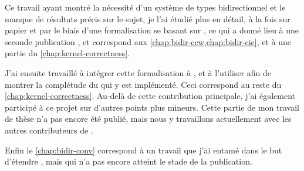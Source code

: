 Ce travail ayant montré la nécessité d’un système de types bidirectionnel
et le manque de résultats précis sur le sujet, je l’ai
étudié plus en détail, à la fois sur papier et par le biais d’une
formalisation se basant sur ,
ce qui a donné lieu à une seconde publication
, et correspond aux
\cref{chap:bidir-ccw,chap:bidir-cic}, et à une partie du
\cref{chap:kernel-correctness}.

J’ai ensuite travaillé à intégrer cette formalisation à
, et à l’utiliser afin de montrer la complétude du 
qui y est implémenté. Ceci correspond au reste du \cref{chap:kernel-correctness}.
Au-delà de cette contribution principale,
j’ai également participé à ce projet sur d’autres points plus mineurs.
Cette partie de mon travail de thèse n’a pas encore été publié, mais nous y
travaillons actuellement avec les autres contributeurs de .

Enfin le \cref{chap:bidir-conv} correspond à un travail que j’ai entamé dans
le but d’étendre , mais qui n’a pas encore atteint le stade de la
publication.